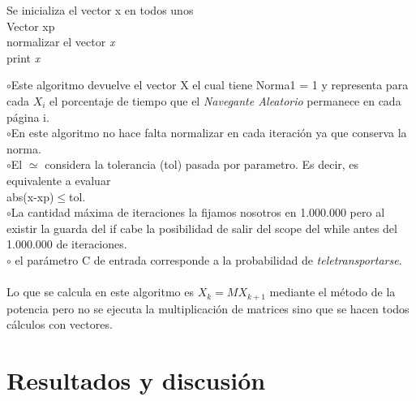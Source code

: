\documentclass[a4paper]{article}
\begin{document}
\IncMargin{1em}
\begin{algorithm}

\BlankLine

Se inicializa el vector x en todos unos \\
Vector xp\\
normalizar el vector \emph{x} \\
print \emph{x}
\end{algorithm}\DecMargin{1em}

$\circ$Este algoritmo devuelve el vector X el cual tiene Norma1 = 1 y representa para cada $X_i$ el porcentaje de tiempo que el \textit{Navegante Aleatorio} permanece en cada p\'agina i. \\
\indent $\circ$En este algoritmo no hace falta normalizar en cada iteraci\'on ya que conserva la norma.\\
\indent $\circ$El $\simeq$ considera la tolerancia (tol) pasada por parametro. Es decir, es equivalente a evaluar \\ abs(x-xp)$\leq$tol. \\
\indent $\circ$La cantidad m\'axima de iteraciones la fijamos nosotros en 1.000.000 pero al existir la guarda del if cabe la posibilidad de salir del scope del while antes del 1.000.000 de iteraciones. \\
\indent $\circ$ el par\'ametro C de entrada corresponde a la probabilidad de \textit{teletransportarse}.\\
\\
Lo que se calcula en este algoritmo es $X_k = M X_{k+1}$ mediante el m\'etodo de la potencia pero no se ejecuta la multiplicaci\'on de matrices sino que se hacen todos c\'alculos con vectores.

\newpage
\section{Resultados y discusi\'on}
\end{document}
